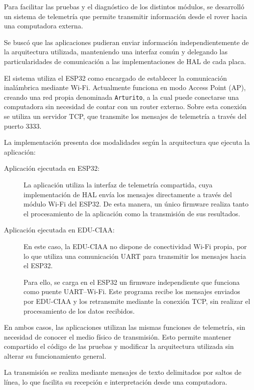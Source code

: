 Para facilitar las pruebas y el diagnóstico de los distintos módulos, se desarrolló un sistema de telemetría que permite transmitir información desde el rover hacia una computadora externa.

Se buscó que las aplicaciones pudieran enviar información independientemente de la arquitectura utilizada, manteniendo una interfaz común y delegando las particularidades de comunicación a las implementaciones de HAL de cada placa.

El sistema utiliza el ESP32 como encargado de establecer la comunicación inalámbrica mediante Wi-Fi. Actualmente funciona en modo Access Point (AP), creando una red propia denominada \texttt{Arturito}, a la cual puede conectarse una computadora sin necesidad de contar con un router externo. Sobre esta conexión se utiliza un servidor TCP, que transmite los mensajes de telemetría a través del puerto 3333.

La implementación presenta dos modalidades según la arquitectura que ejecuta la aplicación:

\begin{description}
	
	\item[Aplicación ejecutada en ESP32:]
	La aplicación utiliza la interfaz de telemetría compartida, cuya implementación de HAL envía los mensajes directamente a través del módulo Wi-Fi del ESP32. De esta manera, un único firmware realiza tanto el procesamiento de la aplicación como la transmisión de sus resultados.
	
	\item[Aplicación ejecutada en EDU-CIAA:]
	En este caso, la EDU-CIAA no dispone de conectividad Wi-Fi propia, por lo que utiliza una comunicación UART para transmitir los mensajes hacia el ESP32.
	
	Para ello, se carga en el ESP32 un firmware independiente que funciona como puente UART--Wi-Fi. Este programa recibe los mensajes enviados por EDU-CIAA y los retransmite mediante la conexión TCP, sin realizar el procesamiento de los datos recibidos.
	
\end{description}

En ambos casos, las aplicaciones utilizan las mismas funciones de telemetría, sin necesidad de conocer el medio físico de transmisión. Esto permite mantener compartido el código de las pruebas y modificar la arquitectura utilizada sin alterar su funcionamiento general.

La transmisión se realiza mediante mensajes de texto delimitados por saltos de línea, lo que facilita su recepción e interpretación desde una computadora.

